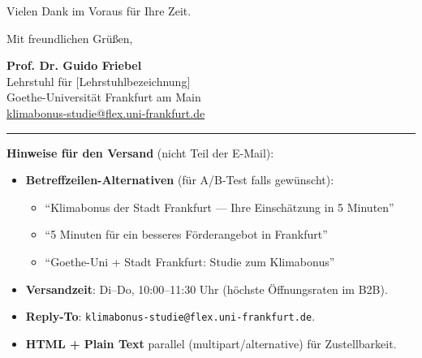 \documentclass[11pt]{article}
\begin{document}
Vielen Dank im Voraus für Ihre Zeit.

\medskip

Mit freundlichen Grüßen,

\textbf{Prof. Dr. Guido Friebel}\\
{\small Lehrstuhl für [Lehrstuhlbezeichnung]\\
Goethe-Universität Frankfurt am Main\\
\href{mailto:klimabonus-studie@flex.uni-frankfurt.de}{klimabonus-studie@flex.uni-frankfurt.de}}


\vspace{2em}
\hrule
\vspace{0.6em}

{\footnotesize\color{gugrey}
\textbf{Hinweise für den Versand} (nicht Teil der E-Mail):

\begin{itemize}\setlength{\itemsep}{0pt}
    \item \textbf{Betreffzeilen-Alternativen} (für A/B-Test falls gewünscht):
    \begin{itemize}\setlength{\itemsep}{-3pt}
        \item ``Klimabonus der Stadt Frankfurt --- Ihre Einschätzung in 5 Minuten''
        \item ``5 Minuten für ein besseres Förderangebot in Frankfurt''
        \item ``Goethe-Uni + Stadt Frankfurt: Studie zum Klimabonus''
    \end{itemize}
    \item \textbf{Versandzeit}: Di--Do, 10:00--11:30 Uhr (höchste Öffnungsraten im B2B).
    \item \textbf{Reply-To}: \texttt{klimabonus-studie@flex.uni-frankfurt.de}.
    \item \textbf{HTML + Plain Text} parallel (multipart/alternative) für Zustellbarkeit.
\end{itemize}
}
\end{document}
